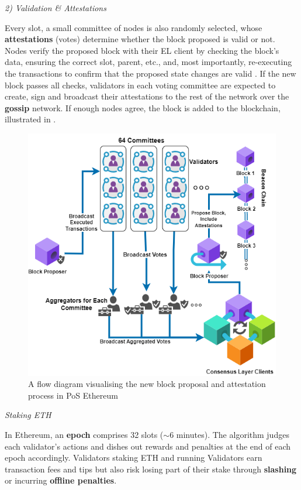 \textit{2) Validation \& Attestations}
\label{AttestationsLitRev}

Every slot, a small committee of nodes is also randomly selected, whose \textbf{attestations} (votes) determine whether the block proposed is valid or not. Nodes verify the proposed block with their EL client by checking the block's data, ensuring the correct slot, parent, etc., and, most importantly, re-executing the transactions to confirm that the proposed state changes are valid \cite{EthereumEthereum.org}. If the new block passes all checks, validators in each voting committee are expected to create, sign and broadcast their attestations to the rest of the network over the \textbf{gossip} network. If enough nodes agree, the block is added to the blockchain,  illustrated in . 

\begin{figure}[!htb]
    \centering
    \includegraphics[width=13cm,center]{Figures/AttestationsDiragram.png}
    \caption{A flow diagram visualising the new block proposal and attestation process in PoS Ethereum}
    \label{Figure:AttestationsDiragram}
\end{figure}

\textit{Staking ETH}

In Ethereum, an \textbf{epoch} comprises 32 slots ($\sim$6 minutes). The algorithm judges each validator's actions and dishes out rewards and penalties at the end of each epoch accordingly. Validators staking ETH and running Validators earn transaction fees and tips but also risk losing part of their stake through \textbf{slashing} or incurring \textbf{offline penalties}.

